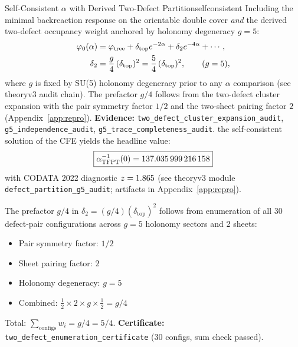 \begin{theorem}{Self-Consistent $\alpha$ with Derived Two-Defect Partition}{selfconsistent}
Including the minimal backreaction response on the orientable double cover \emph{and} the derived two-defect occupancy weight anchored by holonomy degeneracy $g=5$:
\begin{align}
    \varphi_0(\alpha) &= \varphi_{\mathrm{tree}} + \delta_{\mathrm{top}} e^{-2\alpha} + \delta_2 e^{-4\alpha} + \cdots,
    \label{eq:backreaction}\\
    \delta_2 &= \frac{g}{4}\,(\delta_{\mathrm{top}})^2 = \frac54\,(\delta_{\mathrm{top}})^2,
    \qquad (g=5),
\end{align}
where $g$ is fixed by SU(5) holonomy degeneracy prior to any $\alpha$ comparison (see theoryv3 audit chain).
The prefactor $g/4$ follows from the two-defect cluster expansion with the pair symmetry
factor $1/2$ and the two-sheet pairing factor $2$ (Appendix~\ref{app:repro}).
\textbf{Evidence:} \texttt{two\_defect\_cluster\_expansion\_audit}, \texttt{g5\_independence\_audit}, \texttt{g5\_trace\_completeness\_audit}.
the self-consistent solution of the CFE yields the headline value:
\begin{equation}
    \boxed{\alpha^{-1}_{\text{TFPT}}(0) = \num[round-mode=places,round-precision=12]{\TFPTalphaInvGOverFourNum}}
\end{equation}
with CODATA 2022 diagnostic $z=\num[round-mode=places,round-precision=3]{\TFPTalphaZGOverFourNum}$ (see theoryv3 module \texttt{defect\_partition\_g5\_audit}; artifacts in Appendix~\ref{app:repro}).
\end{theorem}

\begin{tcolorbox}[colback=blue!3, colframe=blue!40,
    title={\textbf{Two-Defect Bookkeeping}}, fonttitle=\bfseries\small]
The prefactor $g/4$ in $\delta_2 = (g/4)(\delta_{\mathrm{top}})^2$ follows from
enumeration of all 30 defect-pair configurations across $g=5$ holonomy sectors
and 2 sheets:
\begin{itemize}[leftmargin=1.5em, topsep=2pt, itemsep=1pt]
    \item Pair symmetry factor: $1/2$
    \item Sheet pairing factor: $2$
    \item Holonomy degeneracy: $g=5$
    \item Combined: $\frac{1}{2}\times 2\times g \times \frac{1}{2} = g/4$
\end{itemize}
Total: $\sum_{\text{configs}} w_i = g/4 = 5/4$.\quad
\textbf{Certificate:} \texttt{two\_defect\_enumeration\_certificate} (30 configs, sum check passed).
\end{tcolorbox}


